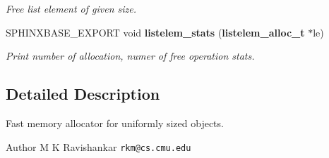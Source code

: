 \begin{DoxyCompactItemize}
\begin{DoxyCompactList}\small\item\em Free list element of given size. \end{DoxyCompactList}\item 
S\+P\+H\+I\+N\+X\+B\+A\+S\+E\+\_\+\+E\+X\+P\+O\+R\+T void {\bf listelem\+\_\+stats} ({\bf listelem\+\_\+alloc\+\_\+t} $\ast$le)\label{listelem__alloc_8h_a838d9361ba76a89a834a7ea6a185b57d}

\begin{DoxyCompactList}\small\item\em Print number of allocation, numer of free operation stats. \end{DoxyCompactList}\end{DoxyCompactItemize}


\subsection{Detailed Description}
Fast memory allocator for uniformly sized objects. 

\begin{DoxyAuthor}{Author}
M K Ravishankar {\tt rkm@cs.\+cmu.\+edu} 
\end{DoxyAuthor}
